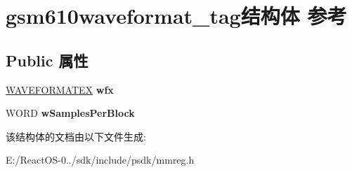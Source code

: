 \hypertarget{structgsm610waveformat__tag}{}\section{gsm610waveformat\+\_\+tag结构体 参考}
\label{structgsm610waveformat__tag}
\subsection*{Public 属性}
\begin{DoxyCompactItemize}
\item 
\mbox{\label{structgsm610waveformat__tag_ac698a1e19e593e667e28d5b91be51bd5}} 
\hyperlink{struct_w_a_v_e_f_o_r_m_a_t_e_x}{W\+A\+V\+E\+F\+O\+R\+M\+A\+T\+EX} {\bfseries wfx}
\item 
\mbox{\label{structgsm610waveformat__tag_a702176bdaa167cb92cb442c28eeed0c2}} 
W\+O\+RD {\bfseries w\+Samples\+Per\+Block}
\end{DoxyCompactItemize}


该结构体的文档由以下文件生成\+:\begin{DoxyCompactItemize}
\item 
E\+:/\+React\+O\+S-\/0../sdk/include/psdk/mmreg.\+h\end{DoxyCompactItemize}
